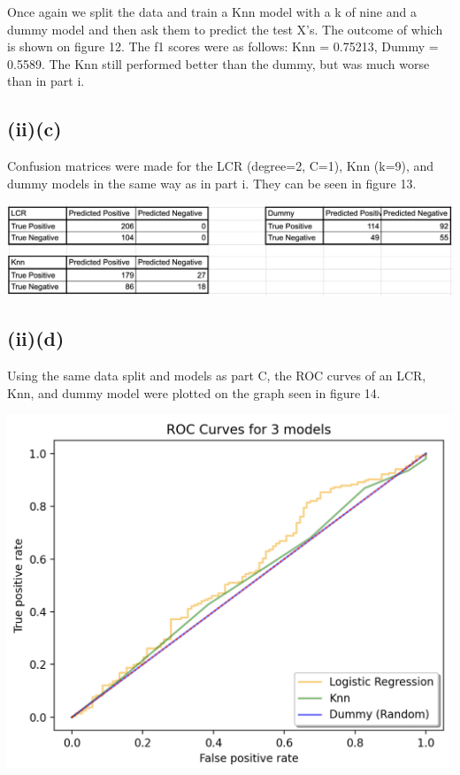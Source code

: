 \documentclass{article}
\begin{document}
Once again we split the data and train a Knn model with a k of nine and a dummy model and then ask them to predict the test X's. The outcome of which is shown on figure 12. The f1 scores were as follows: Knn = 0.75213, Dummy = 0.5589. The Knn still performed better than the dummy, but was much worse than in part i.

\subsection{(ii)(c)}
Confusion matrices were made for the LCR (degree=2, C=1), Knn (k=9), and dummy models in the same way as in part i. They can be seen in figure 13.
\begin{center}
\includegraphics[width=\linewidth]{con}
\end{center}

\subsection{(ii)(d)}
Using the same data split and models as part C, the ROC curves of an LCR, Knn, and dummy model were plotted on the graph seen in figure 14.

\begin{center}
\includegraphics[width=.8\linewidth]{roc2.png}
\end{center}
\end{document}
